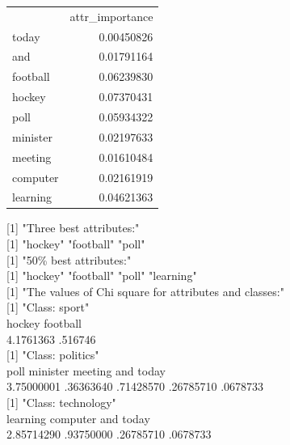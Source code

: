 \documentclass[10pt]{book}
\begin{document}
\begin{center}
\begin{tabular}{lr}
 & attr\_importance \\
today & 0.00450826 \\
and & 0.01791164 \\
football & 0.06239830 \\
hockey & 0.07370431 \\
poll & 0.05934322 \\
minister & 0.02197633 \\
meeting & 0.01610484 \\
computer & 0.02161919 \\
learning & 0.04621363 \\
\end{tabular}
\end{center}

[1] "Three best attributes:"\\[0pt]
[1] "hockey" "football" "poll"\\[0pt]
[1] "50\% best attributes:"\\[0pt]
[1] "hockey" "football" "poll" "learning"\\[0pt]
[1] "The values of Chi square for attributes and classes:"\\[0pt]
[1] "Class: sport"\\
hockey football\\
4.1761363 .516746\\[0pt]
[1] "Class: politics"\\
poll minister meeting and today\\
3.75000001 .36363640 .71428570 .26785710 .0678733\\[0pt]
[1] "Class: technology"\\
learning computer and today\\
2.85714290 .93750000 .26785710 .0678733
\end{document}
